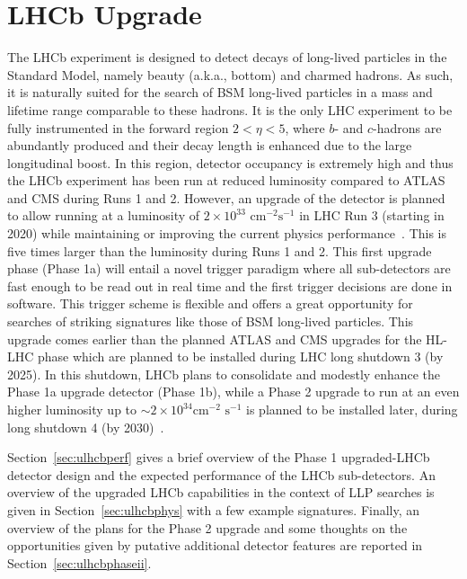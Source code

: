 \section{LHCb Upgrade}\label{sec:LHCb_upgrade}


The LHCb experiment is designed to detect decays of long-lived particles in the Standard Model, namely beauty (a.k.a., bottom) and charmed hadrons. As such, it is naturally suited for the search of BSM long-lived particles in a mass and lifetime range comparable to these hadrons. It is the only LHC experiment to be fully instrumented in the forward region $2<\eta<5$, where $b$- and $c$-hadrons are abundantly produced and their decay length is enhanced due to the large longitudinal boost. In this
region, detector occupancy is extremely high and thus the LHCb experiment has been run at reduced luminosity compared to ATLAS and CMS during Runs 1 and 2. However, an upgrade of the detector is planned to allow running at a luminosity of $2\times 10^{33}\,\,\text{cm}^{-2}\text{s}^{-1}$ in LHC Run 3 (starting in 2020) while maintaining or improving the current physics performance~\cite{LHCbUpgradeTDR}. This is five times larger than the luminosity during Runs 1 and 2. This first upgrade phase (Phase 1a) will entail a novel trigger paradigm where all sub-detectors are fast enough to be read out in real time and the first trigger decisions are done in software. This trigger scheme is flexible and offers a great opportunity for searches of striking signatures like those of BSM long-lived particles. This upgrade comes earlier than the planned ATLAS and CMS upgrades for the HL-LHC phase which are planned to be installed during LHC long shutdown 3 (by 2025). In this shutdown, LHCb plans to consolidate and modestly enhance the Phase 1a upgrade detector (Phase 1b), while a Phase 2 upgrade to run at an even higher luminosity up to $\sim 2\times 10^{34}\text{cm}^{-2}\,\,\text{s}^{-1}$ is planned to be installed later, during long shutdown 4 (by 2030)~\cite{LHCbUpgradeIIPC}.

Section~\ref{sec:ulhcbperf} gives a brief overview of the Phase 1 upgraded-LHCb detector design and the expected performance of the LHCb sub-detectors. An overview of the upgraded LHCb capabilities in the context of LLP searches is given in Section~\ref{sec:ulhcbphys} with a few example signatures. Finally, an overview of the plans for the Phase 2 upgrade and some thoughts on the opportunities given by putative additional detector features are reported in Section~\ref{sec:ulhcbphaseii}.

